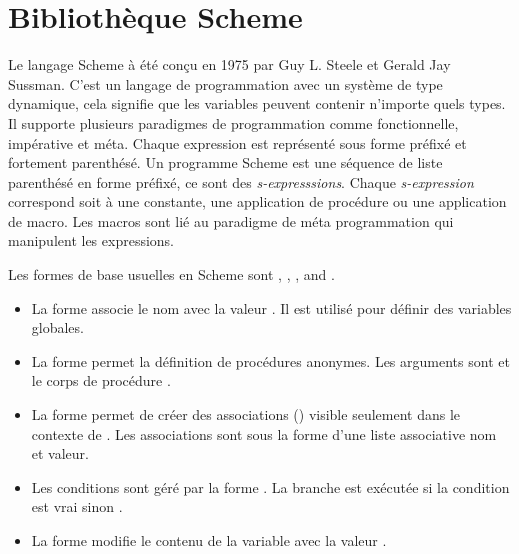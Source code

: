 
\chapter{Bibliothèque Scheme}

Le langage Scheme\cite{Scheme} à été conçu en 1975 par Guy L. Steele et Gerald
Jay Sussman.  C'est un langage de programmation avec un système de type
dynamique, cela signifie que les variables peuvent contenir n'importe quels
types. Il supporte plusieurs paradigmes de programmation comme fonctionnelle,
impérative et méta. Chaque expression est représenté sous forme préfixé et
fortement parenthésé.  Un programme Scheme est une séquence de liste parenthésé
en forme préfixé, ce sont des \textit{s-expresssions}.  Chaque
\textit{s-expression} correspond soit à une constante, une application de
procédure ou une application de macro. Les macros sont lié au paradigme de
méta programmation qui manipulent les expressions.

Les formes de base usuelles en Scheme sont , ,
,  and .
\begin{itemize}
  \item La forme  associe le nom  avec
    la valeur . Il est utilisé pour définir des variables globales.

  \item La forme  permet la définition de
    procédures anonymes. Les arguments sont  et le corps
    de procédure .

  \item La forme  permet de créer des
    associations () visible seulement dans le contexte de
    . Les associations sont sous la forme d'une liste
    associative nom et valeur.

  \item Les conditions sont géré par la forme .
    La branche  est exécutée si la condition  est
    vrai sinon .

  \item La forme  modifie le contenu de la variable
     avec la valeur .
\end{itemize}


